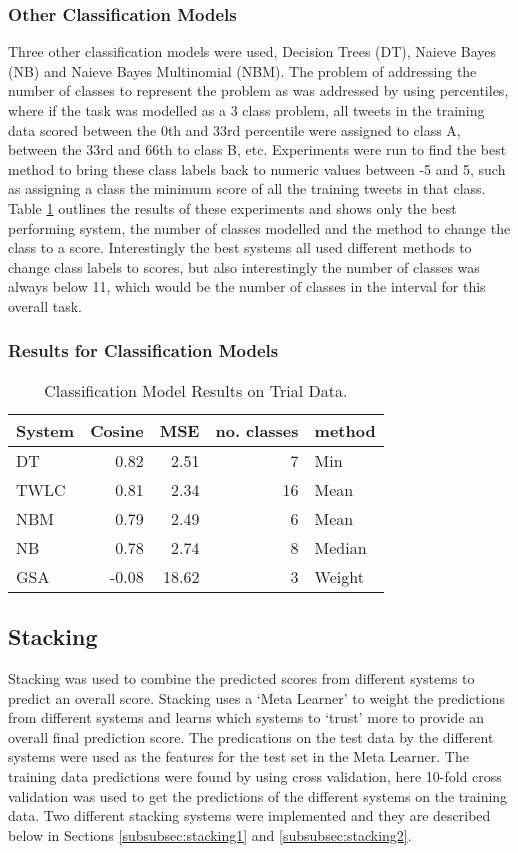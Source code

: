 \documentclass[11pt,letterpaper]{article}
\begin{document}
\subsubsection{Other Classification Models}
Three other classification models were used, Decision Trees (DT), Naieve Bayes (NB) and Naieve Bayes Multinomial (NBM). The problem of addressing the number of classes to represent the problem as was addressed by using percentiles, where if the task was modelled as a 3 class problem, all tweets in the training data scored between the 0th and 33rd percentile were assigned to class A, between the 33rd and 66th to class B, etc. Experiments were run to find the best method to bring these class labels back to numeric values between -5 and 5, such as assigning a class the minimum score of all the training tweets in that class. Table \ref{tbl:classificicationResults} outlines the results of these experiments and shows only the best performing system, the number of classes modelled and the method to change the class to a score. Interestingly the best systems all used different methods to change class labels to scores, but also interestingly the number of classes was always below 11, which would be the number of classes in the interval for this overall task.

\subsubsection{Results for Classification Models}
\begin{table}[ht!]
\begin{tabular}{|l|r|r|r|l|}
\hline
System & Cosine & MSE & no. classes & method\\
\hline
DT & 0.82 & 2.51 & 7 & Min\\
TWLC & 0.81 & 2.34 & 16 & Mean \\
NBM& 0.79 & 2.49 & 6 & Mean\\
NB & 0.78 & 2.74 & 8 & Median\\
GSA & -0.08 & 18.62 & 3 & Weight\\
\hline
\end{tabular}
\caption{Classification Model Results on Trial Data.}
\label{tbl:classificicationResults}
\end{table}



\subsection{Stacking}
Stacking was used to combine the predicted scores from different systems to predict an overall score. Stacking uses a `Meta Learner' to weight the predictions from different systems and learns which systems to `trust' more to provide an overall final prediction score. The predications on the test data by the different systems were used as the features for the test set in the Meta Learner. The training data predictions were found by using cross validation, here 10-fold cross validation was used to get the predictions of the different systems on the training data. Two different stacking systems were implemented and they are described below in Sections \ref{subsubsec:stacking1} and \ref{subsubsec:stacking2}.
\end{document}
